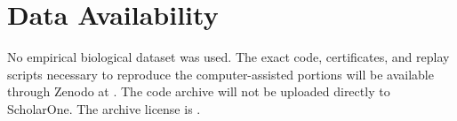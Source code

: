 \documentclass[12pt,twoside]{article}
\providecommand{\KThreePCanonicalRoot}{manuscript}
\begin{document}
\section*{Data Availability}

No empirical biological dataset was used. The exact code, certificates, and
replay scripts necessary to reproduce the computer-assisted portions will be
available through Zenodo at
\texttt{}. The code archive will
not be uploaded directly to ScholarOne. The archive license is
\texttt{}.

{\small


}
\end{document}
